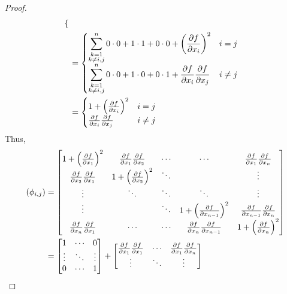 \documentclass[../psets.tex]{subfiles}
\begin{document}
\begin{enumerate}[label={\textbf{4.4.\roman*.}}]
\begin{proof}
\begin{align*}
\begin{cases}
            \end{cases}\\
            &=
            \begin{cases}
                \displaystyle\sum_{\substack{k=1\\k\neq i,j}}^n0\cdot 0+1\cdot 1+0\cdot 0+\left( \pdv{f}{x_i} \right)^2 & i=j\\
                \displaystyle\sum_{\substack{k=1\\k\neq i,j}}^n0\cdot 0+1\cdot 0+0\cdot 1+\pdv{f}{x_i}\pdv{f}{x_j} & i\neq j
            \end{cases}\\
            &=
            \begin{cases}
                1+\left( \pdv{f}{x_i} \right)^2 & i=j\\
                \pdv{f}{x_i}\pdv{f}{x_j} & i\neq j
            \end{cases}
        \end{align*}
        Thus,
        \begin{align*}
            (\phi_{i,j}) &=
            \begin{bmatrix}
                1+\left( \pdv{f}{x_1} \right)^2 & \pdv{f}{x_1}\pdv{f}{x_2} & \cdots & \cdots & \pdv{f}{x_1}\pdv{f}{x_n}\\
                \pdv{f}{x_2}\pdv{f}{x_1} & 1+\left( \pdv{f}{x_2} \right)^2 & \ddots &  & \vdots\\
                \vdots & \ddots & \ddots & \ddots & \vdots\\
                \vdots &  & \ddots & 1+\left( \pdv{f}{x_{n-1}} \right)^2 & \pdv{f}{x_{n-1}}\pdv{f}{x_n}\\
                \pdv{f}{x_n}\pdv{f}{x_1} & \cdots & \cdots & \pdv{f}{x_n}\pdv{f}{x_{n-1}} & 1+\left( \pdv{f}{x_n} \right)^2\\
            \end{bmatrix}\\
            &=
            \begin{bmatrix}
                1 & \cdots & 0\\
                \vdots & \ddots & \vdots\\
                0 & \cdots & 1\\
            \end{bmatrix}
            +
            \begin{bmatrix}
                \pdv{f}{x_1}\pdv{f}{x_1} & \cdots & \pdv{f}{x_1}\pdv{f}{x_n}\\
                \vdots & \ddots & \vdots\\

\end{bmatrix}
\end{align*}
\end{proof}
\end{enumerate}
\end{document}
